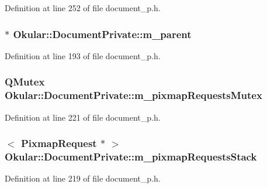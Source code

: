 Definition at line 252 of file document\+\_\+p.\+h.

\hypertarget{classOkular_1_1DocumentPrivate_ac921eda41c014869ffec96ecc569c713}{
\subsubsection[{m\+\_\+parent}]{$\ast$ Okular\+::\+Document\+Private\+::m\+\_\+parent}}\label{classOkular_1_1DocumentPrivate_ac921eda41c014869ffec96ecc569c713}


Definition at line 193 of file document\+\_\+p.\+h.

\hypertarget{classOkular_1_1DocumentPrivate_a5c0e919d575a7a3c19a42c64a672fce4}{
\subsubsection[{m\+\_\+pixmap\+Requests\+Mutex}]{\setlength{\rightskip}{0pt plus 5cm}Q\+Mutex Okular\+::\+Document\+Private\+::m\+\_\+pixmap\+Requests\+Mutex}}\label{classOkular_1_1DocumentPrivate_a5c0e919d575a7a3c19a42c64a672fce4}


Definition at line 221 of file document\+\_\+p.\+h.

\hypertarget{classOkular_1_1DocumentPrivate_af903e531960617af53b4bc79b3a95efa}{
\subsubsection[{m\+\_\+pixmap\+Requests\+Stack}]{$<$ {\bf Pixmap\+Request} $\ast$ $>$ Okular\+::\+Document\+Private\+::m\+\_\+pixmap\+Requests\+Stack}}\label{classOkular_1_1DocumentPrivate_af903e531960617af53b4bc79b3a95efa}


Definition at line 219 of file document\+\_\+p.\+h.

